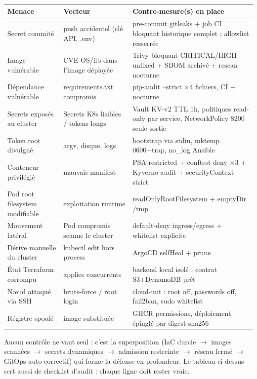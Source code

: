 \documentclass[12pt,a4paper,oneside]{report}
\begin{document}
\begin{center}\label{tab:ch-modele-de-menaces-simplifie-et-contre-mesures}\end{center}
\begin{longtable}{@{}p{3.6cm}p{5.6cm}p{5.0cm}@{}}
\toprule
\textbf{Menace} & \textbf{Vecteur} & \textbf{Contre-mesure(s) en place} \\
\midrule
\endhead
Secret commité & push accidentel (clé API, .env) & pre-commit gitleaks + job CI bloquant historique complet ; allowlist resserrée \\
Image vulnérable & CVE OS/lib dans l'image déployée & Trivy bloquant CRITICAL/HIGH unfixed + SBOM archivé + rescan nocturne \\
Dépendance vulnérable & requirements.txt compromis & pip-audit --strict ×4 fichiers, CI + nocturne \\
Secrets exposés au cluster & Secrets K8s lisibles / tokens longs & Vault KV-v2 TTL 1h, politiques read-only par service, NetworkPolicy 8200 seule sortie \\
Token root divulgué & argv, disque, logs & bootstrap via stdin, mktemp 0600+trap, no\_log Ansible \\
Conteneur privilégié & mauvais manifest & PSA restricted + conftest deny ×3 + Kyverno audit + securityContext strict \\
Pod root filesystem modifiable & exploitation runtime & readOnlyRootFilesystem + emptyDir /tmp \\
Mouvement latéral & Pod compromis scanne le cluster & default-deny ingress/egress + whitelist explicite \\
Dérive manuelle du cluster & kubectl edit hors process & ArgoCD selfHeal + prune \\
État Terraform corrompu & applies concurrents & backend local isolé ; contrat S3+DynamoDB prêt \\
Nœud attaqué via SSH & brute-force / root login & cloud-init : root off, passwords off, fail2ban, sudo whitelist \\
Régistre spoofé & image substituée & GHCR permissions, déploiement épinglé par digest sha256 \\
\bottomrule
\end{longtable}

\begin{whybox}
Aucun contrôle ne vaut seul : c'est la superposition (IaC durcie $\rightarrow$ images scannées $\rightarrow$ secrets dynamiques $\rightarrow$ admission restreinte $\rightarrow$ réseau fermé $\rightarrow$ GitOps auto-correctif) qui forme la défense en profondeur. Le tableau ci-dessus sert aussi de checklist d'audit : chaque ligne doit rester vraie.
\end{whybox}
\end{document}
